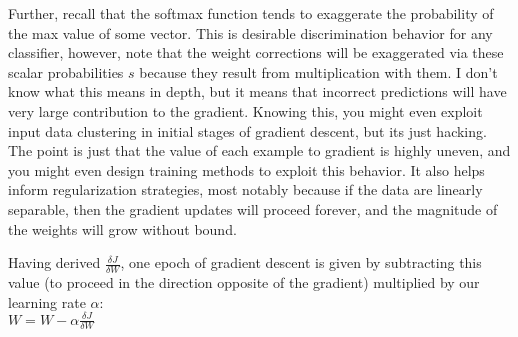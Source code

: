 \documentclass{article}
\begin{document}
Further, recall that the softmax function tends to exaggerate the probability of the max value of some vector. This is desirable discrimination behavior for any classifier, however, note that the weight corrections will be exaggerated via these scalar probabilities $s$ because they result from multiplication with them. I don't know what this means in depth, but it means that incorrect predictions will have very large contribution to the gradient. Knowing this, you might even exploit input data clustering in initial stages of gradient descent, but its just hacking. The point is just that the value of each example to gradient is highly uneven, and you might even design training methods to exploit this behavior. It also helps inform regularization strategies, most notably because if the data are linearly separable, then the gradient updates will proceed forever, and the magnitude of the weights will grow without bound.


Having derived $\frac{\delta J}{\delta W}$, one epoch of gradient descent is given by subtracting this value (to proceed in the direction opposite of the gradient) multiplied by our learning rate $\alpha$: \\

$ W = W - \alpha \frac{\delta J}{\delta W}$
\end{document}
